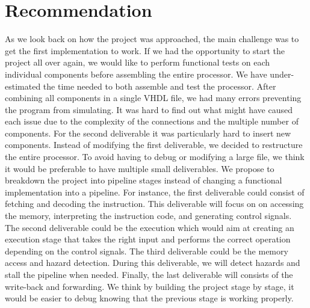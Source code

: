 \documentclass[conference]{IEEEtran}
\begin{document}
\section{Recommendation}

As we look back on how the project was approached, the main challenge was to get the first implementation to work. If we had the opportunity to start the project all over again, we would like to perform functional tests on each individual components before assembling the entire processor. We have under-estimated the time needed to both assemble and test the processor. After combining all components in a single VHDL file, we had many errors preventing the program from simulating. It was hard to find out what might have caused each issue due to the complexity of the connections and the multiple number of components. For the second deliverable it was particularly hard to insert new components. Instead of modifying the first deliverable, we decided to restructure the entire processor. To avoid having to debug or modifying a large file, we think it would be preferable to have multiple small deliverables. We propose to breakdown the project into pipeline stages instead of changing a functional implementation into a pipeline. For instance, the first deliverable could consist of fetching and decoding the instruction. This deliverable will focus on on accessing the memory, interpreting the instruction code, and generating control signals. The second deliverable could be the execution which would aim at creating an execution stage that takes the right input and performs the correct operation depending on the control signals. The third deliverable could be the memory access and hazard detection. During this deliverable, we will detect hazards and stall the pipeline when needed. Finally, the last deliverable will consists of the write-back and forwarding. We think by building the project stage by stage, it would be easier to debug knowing that the previous stage is working properly.


%
%
\end{document}
